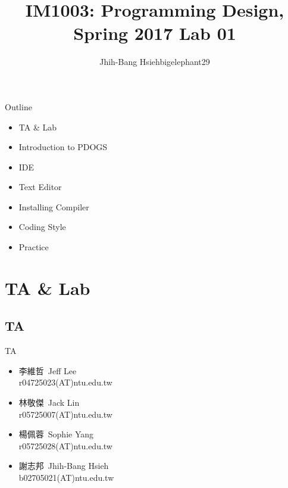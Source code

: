 \documentclass[t]{beamer}
\title{IM1003: Programming Design, Spring 2017  \linebreak Lab 01}
\author[bigelephant29]{Jhih-Bang Hsieh\linebreak \small{bigelephant29}}
\institute{\textbf{National Taiwan University}}
\date{}
\begin{document}
\begin{frame}
  \maketitle
\end{frame}

\begin{frame}{Outline}
  \begin{itemize}
    \item TA \& Lab
    \item Introduction to PDOGS
    \item IDE
    \item Text Editor
    \item Installing Compiler
    \item Coding Style
    \item Practice
  \end{itemize}
\end{frame}

\section{TA \& Lab}
\subsection{TA}
\begin{frame}{TA}
  \begin{itemize}
    \setlength\itemsep{1em}
    \item
    李維哲\ Jeff Lee\\
    r04725023(AT)ntu.edu.tw
    \item
    林敬傑\ Jack Lin\\
    r05725007(AT)ntu.edu.tw
    \item
    楊佩蓉\ Sophie Yang\\
    r05725028(AT)ntu.edu.tw
    \item
    謝志邦\ Jhih-Bang Hsieh\\
    b02705021(AT)ntu.edu.tw
  \end{itemize}
\end{frame}
\end{document}
